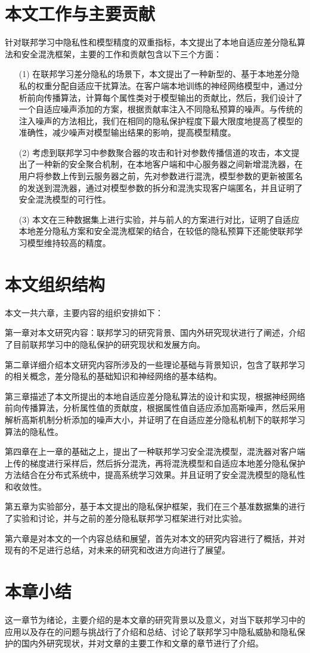 \section{本文工作与主要贡献}
针对联邦学习中隐私性和模型精度的双重指标，本文提出了本地自适应差分隐私算法和安全混洗框架，主要的工作和贡献包含以下三个方面：
\begin{enumerate}
\item [(1)] 在联邦学习差分隐私的场景下，本文提出了一种新型的、基于本地差分隐私的权重分配自适应干扰算法。在客户端本地训练的神经网络模型中，通过分析前向传播算法，计算每个属性类对于模型输出的贡献比，然后，我们设计了一个自适应噪声添加的方案，根据贡献率注入不同隐私预算的噪声。与传统的注入噪声的方法相比，我们在相同的隐私保护程度下最大限度地提高了模型的准确性，减少噪声对模型输出结果的影响，提高模型精度。
\item [(2)] 考虑到联邦学习中参数聚合器的攻击和针对参数传播信道的攻击，本文提出了一种新的安全聚合机制，在本地客户端和中心服务器之间新增混洗器，在用户将参数上传到云服务器之前，先对参数进行混洗，模型参数的更新被匿名的发送到混洗器，通过对模型参数的拆分和混洗实现客户端匿名，并且证明了安全混洗模型的可行性。
\item [(3)] 本文在三种数据集上进行实验，并与前人的方案进行对比，证明了自适应本地差分隐私方案和安全混洗框架的结合，在较低的隐私预算下还能使联邦学习模型维持较高的精度。
\end{enumerate}

\section{本文组织结构}

本文一共六章，主要内容的组织安排如下：

第一章对本文研究内容：联邦学习的研究背景、国内外研究现状进行了阐述，介绍了目前联邦学习中的隐私保护的研究现状和发展方向。

第二章详细介绍本文研究内容所涉及的一些理论基础与背景知识，包含了联邦学习的相关概念，差分隐私的基础知识和神经网络的基本结构。

第三章描述了本文所提出的本地自适应差分隐私算法的设计和实现，根据神经网络前向传播算法，分析属性值的贡献度，根据属性值自适应添加高斯噪声，然后采用解析高斯机制分析添加的噪声大小，并证明了在自适应差分隐私机制下的联邦学习算法的隐私性。
  
第四章在上一章的基础之上，提出了一种联邦学习安全混洗模型，混洗器对客户端上传的梯度进行采样后，然后拆分混洗，再将混洗模型和自适应本地差分隐私保护方法结合在分布式系统中，提高系统学习效果。并且证明了安全混洗模型的隐私性和收敛性。
    
第五章为实验部分，基于本文提出的隐私保护框架，我们在三个基准数据集的进行了实验和讨论，并与之前的差分隐私联邦学习框架进行对比实验。

第六章是对本文的一个内容总结和展望，首先对本文的研究内容进行了概括，并对现有的不足进行总结，对未来的研究和改进方向进行了展望。

\section{本章小结}
这一章节为绪论，主要介绍的是本文章的研究背景以及意义，对当下联邦学习中的应用以及存在的问题与挑战行了介绍和总结、讨论了联邦学习中隐私威胁和隐私保护的国内外研究现状，并对文章的主要工作和文章的章节进行了介绍。

